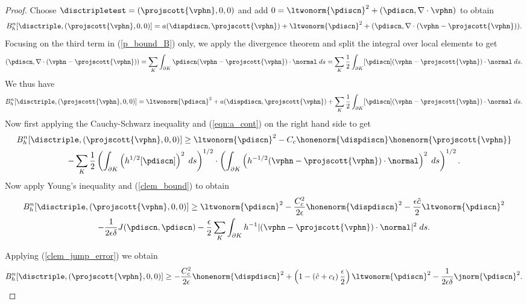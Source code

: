 \begin{proof}
Choose $\disctripletest = (\projscott {\vphn} ,0,0)$ and add $0=\ltwonorm{\pdiscn}^{2} + (\pdiscn, \nabla \cdot {\vphn})$ to obtain
\begin{equation}
 B_{h}^{n}[\disctriple,(\projscott {\vphn},0,0)] = a(\dispdiscn,\projscott {\vphn}) + \ltwonorm{\pdiscn}^{2} + (\pdiscn, \nabla \cdot ( {\vphn} - \projscott {\vphn} )).
 \label{p_bound_B}
\end{equation}
\noindent Focusing on the third term in (\ref{p_bound_B}) only, we apply the divergence theorem and split the integral over local elements to get
\begin{equation*}
 (\pdiscn, \nabla \cdot ({\vphn} - \projscott {\vphn}))= \sum_{K} \int_{\partial K }  \pdiscn   ({\vphn} - \projscott {\vphn}) \cdot \normal \;{d}s=\sum_{K} \frac{1}{2}\int_{\partial K }  [\pdiscn]   ({\vphn} - \projscott {\vphn}) \cdot \normal \;ds.
\end{equation*}
We thus have
\begin{equation*}
  B_{h}^{n}[\disctriple,(\projscott {\vphn},0,0)]  =\ltwonorm{\pdiscn}^{2}+  a(\dispdiscn,\projscott {\vphn})+  \sum_{K} \frac{1}{2}\int_{\partial K }  [\pdiscn]   ({\vphn} - \projscott {\vphn}) \cdot \normal \;{d}s.
\end{equation*}
Now first applying the Cauchy-Schwarz inequality and (\ref{eqn:a_cont}) on the right hand side to get
\begin{multline*}
  B_{h}^{n}[\disctriple,(\projscott {\vphn},0,0)]  \geq \ltwonorm{\pdiscn}^{2} - C_{c} \honenorm{\dispdiscn} \honenorm{\projscott {\vphn}} \\ -  \sum_{K} \frac{1}{2} \left( \int_{\partial K } \left(h^{1/2} [\pdiscn]\right)^{2} \;ds \right)^{1/2} \cdot \left( \int_{\partial K } \left( h^{-1/2} ({\vphn} - \projscott {\vphn}) \cdot \normal\right)^{2} \;ds \right)^{1/2}.
\end{multline*}
Now apply Young's inequality and (\ref{clem_bound}) to obtain
\begin{multline*}
  B_{h}^{n}[\disctriple,(\projscott {\vphn},0,0)]  \geq \ltwonorm{\pdiscn}^{2} -  \frac{C_{c}^{2}}{2\epsilon} \honenorm{\dispdiscn}^{2}-\frac{\epsilon \hat{c}}{2} \ltwonorm{\pdiscn}^{2} \\ -  \frac{1}{2\epsilon\delta}  J(\pdiscn,\pdiscn) - \frac{\epsilon}{2} \sum_{K} \int_{\partial K } h^{-1} |({\vphn} - \projscott {\vphn}) \cdot \normal|^{2} \;ds .
\end{multline*}

Applying (\ref{clem_jump_error}) we obtain
\begin{multline}
 B_{h}^{n}[\disctriple,(\projscott {\vphn},0,0)] \geq  -\frac{C_{c}^{2}}{2\epsilon} \honenorm{\dispdiscn}^{2}+ \left(1-\left(\hat{c}+{c_{t}}\right) \frac{\epsilon}{2}\right) \ltwonorm{\pdiscn}^{2} -  \frac{1}{2 \epsilon \delta} \jnorm{\pdiscn}^{2}.
    \label{ltwopbound}
\end{multline} \newline


\end{proof}
